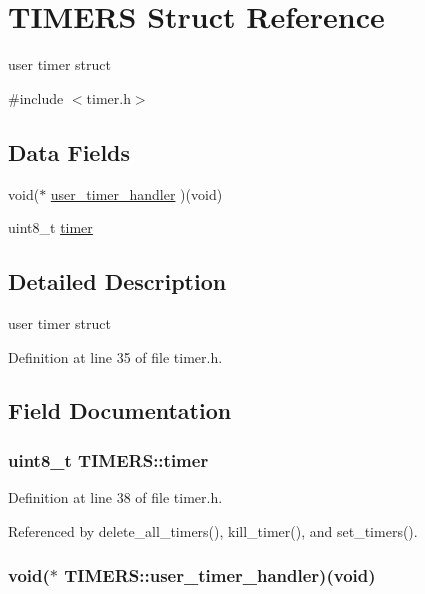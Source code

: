\hypertarget{structTIMERS}{\section{T\-I\-M\-E\-R\-S Struct Reference}
\label{structTIMERS}
}


user timer struct  




{\ttfamily \#include $<$timer.\-h$>$}

\subsection*{Data Fields}
\begin{DoxyCompactItemize}
\item 
void($\ast$ \hyperlink{structTIMERS_a66bb89d328cf2c3f1b9362d7ea207c29}{user\-\_\-timer\-\_\-handler} )(void)
\item 
uint8\-\_\-t \hyperlink{structTIMERS_a0b10fdb7b0e6b1d3ca49718f47c4514d}{timer}
\end{DoxyCompactItemize}


\subsection{Detailed Description}
user timer struct 

Definition at line 35 of file timer.\-h.



\subsection{Field Documentation}
\hypertarget{structTIMERS_a0b10fdb7b0e6b1d3ca49718f47c4514d}{
\subsubsection[{timer}]{\setlength{\rightskip}{0pt plus 5cm}uint8\-\_\-t T\-I\-M\-E\-R\-S\-::timer}}\label{structTIMERS_a0b10fdb7b0e6b1d3ca49718f47c4514d}


Definition at line 38 of file timer.\-h.



Referenced by delete\-\_\-all\-\_\-timers(), kill\-\_\-timer(), and set\-\_\-timers().

\hypertarget{structTIMERS_a66bb89d328cf2c3f1b9362d7ea207c29}{
\subsubsection[{user\-\_\-timer\-\_\-handler}]{\setlength{\rightskip}{0pt plus 5cm}void($\ast$ T\-I\-M\-E\-R\-S\-::user\-\_\-timer\-\_\-handler)(void)}}\label{structTIMERS_a66bb89d328cf2c3f1b9362d7ea207c29}


